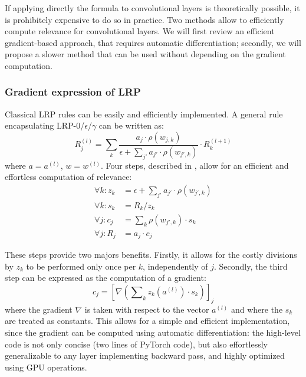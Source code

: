 \documentclass{../cs-classes/cs-classes}
\newcommand*{\1}{\digitsbb{1}}
\newcommand*{\0}{\digitsbb{0}}
\begin{document}
If applying directly the formula to convolutional layers is theoretically possible, it is prohibitely expensive to do so in practice. Two methods allow to efficiently compute relevance for convolutional layers. We will first review an efficient gradient-based approach, that requires automatic differentiation; secondly, we will propose a slower method that can be used without depending on the gradient computation.

\subsubsection{Gradient expression of LRP}
Classical LRP rules can be easily and efficiently implemented. A general rule encapsulating LRP-0/$\epsilon$/$\gamma$ can be written as:
\begin{equation}
    R_j^{(l)} = \sum_k\frac{a_j\cdot\rho(w_{j,k})}{\epsilon+\sum_{j'}a_{j'}\cdot{\rho(w_{j',k})}} \cdot R_k^{(l+1)}
\end{equation}
where $a=a^{(l)}$, $w=w^{(l)}$. Four steps, described in \cite{montavon-lrp}, allow for an efficient and effortless computation of relevance:
\begin{equation}
    \begin{aligned}
        \textstyle\forall k: z_k &= \epsilon + \sum\nolimits_{j'}a_{j'}\cdot\rho(w_{j',k})\\
        \forall k: s_k &= R_k / z_k\\
        \forall j: c_j &= \sum\nolimits_k\rho(w_{j',k})\cdot s_k\\
        \forall j: \!R_j &= a_j\cdot c_j
    \end{aligned}
\end{equation}

These steps provide two majors benefits. Firstly, it allows for the costly divisions by $z_k$ to be performed only once per $k$, independently of $j$. Secondly, the third step can be expressed as the computation of a gradient:
\begin{equation}
    c_j = \left[\nabla\left(\sum\nolimits_k z_k(a^{(l)})\cdot s_k\right)\right]_j
\end{equation}
where the gradient $\nabla$ is taken with respect to the vector $a^{(l)}$ and where the $s_k$ are treated as constants. This allows for a simple and efficient implementation, since the gradient can be computed using automatic differentiation: the high-level code is not only concise (two lines of PyTorch code), but also effortlessly generalizable  to any layer implementing backward pass, and highly optimized using GPU operations.
\end{document}
